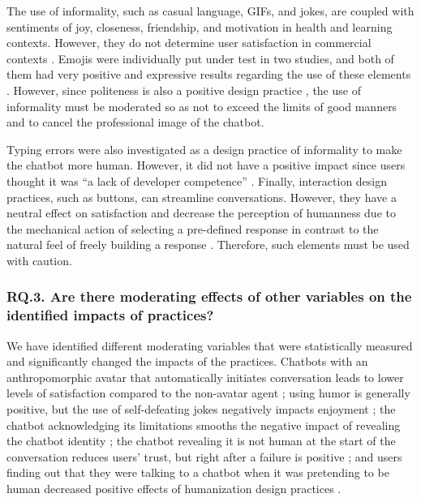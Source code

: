 The use of informality, such as casual language, GIFs, and jokes, are coupled with sentiments of joy, closeness, friendship, and motivation in health and learning contexts. However, they do not determine user satisfaction in commercial contexts . Emojis were individually put under test in two studies, and both of them had very positive and expressive results regarding the use of these elements . However, since politeness is also a positive design practice , the use of informality must be moderated so as not to exceed the limits of good manners and to cancel the professional image of the chatbot.

Typing errors were also investigated as a design practice of informality to make the chatbot more human. However, it did not have a positive impact since users thought it was ``a lack of developer competence'' . Finally, interaction design practices, such as buttons, can streamline conversations. However, they have a neutral effect on satisfaction and decrease the perception of humanness due to the mechanical action of selecting a pre-defined response in contrast to the natural feel of freely building a response . Therefore, such elements must be used with caution.

\subsubsection{RQ.3. Are there moderating effects of other variables on the identified impacts of practices? }

We have identified different moderating variables that were statistically measured and significantly changed the impacts of the practices.  Chatbots with an anthropomorphic avatar that automatically initiates conversation leads to lower levels of satisfaction compared to the non-avatar agent ; using humor is generally positive, but the use of self-defeating jokes negatively impacts enjoyment ; the chatbot acknowledging its limitations smooths the negative impact of revealing the chatbot identity ; the chatbot revealing it is not human at the start of the conversation reduces users' trust, but right after a failure is positive ; and users finding out that they were talking to a chatbot when it was pretending to be human decreased positive effects of humanization design practices .

